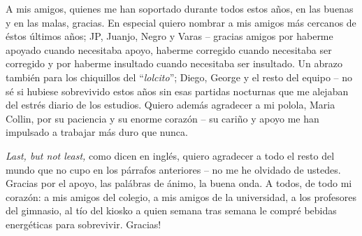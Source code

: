 \begin{thanks}
    A mis amigos, quienes me han soportado durante todos estos años, en las buenas y en las malas, gracias. En especial quiero nombrar a mis amigos más cercanos de éstos últimos años; JP, Juanjo, Negro y Varas -- gracias amigos por haberme apoyado cuando necesitaba apoyo, haberme corregido cuando necesitaba ser corregido y por haberme insultado cuando necesitaba ser insultado. Un abrazo también para los chiquillos del ``\emph{lolcito}''; Diego, George y el resto del equipo -- no sé si hubiese sobrevivido estos años sin esas partidas nocturnas que me alejaban del estrés diario de los estudios. Quiero además agradecer a mi polola, Maria Collin, por su paciencia y su enorme corazón -- su cariño y apoyo me han impulsado a trabajar más duro que nunca.
    
    \emph{Last, but not least,} como dicen en inglés, quiero agradecer a todo el resto del mundo que no cupo en los párrafos anteriores -- no me he olvidado de ustedes. Gracias por el apoyo, las palábras de ánimo, la buena onda. A todos, de todo mi corazón: a mis amigos del colegio, a mis amigos de la universidad, a los profesores del gimnasio, al tío del kiosko a quien semana tras semana le compré bebidas energéticas para sobrevivir. Gracias!
\end{thanks}